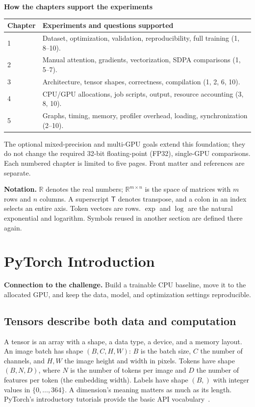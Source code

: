 \documentclass[11pt,a4paper,oneside]{report}
\newcommand{\R}{\mathbb{R}}
\newcommand{\purpose}[1]{\textbf{Connection to the challenge.} #1\par}
\newcounter{chapterstartpage}
\begin{document}
\textbf{How the chapters support the experiments}
\begin{center}
\begin{tabularx}{\textwidth}{@{}lY@{}}
\toprule
Chapter & Experiments and questions supported\\ & Dataset, optimization, validation, reproducibility, full training (1, 8--10).\\
2 & Manual attention, gradients, vectorization, SDPA comparisons (1, 5--7).\\
3 & Architecture, tensor shapes, correctness, compilation (1, 2, 6, 10).\\
4 & CPU/GPU allocations, job scripts, output, resource accounting (3, 8, 10).\\
5 & Graphs, timing, memory, profiler overhead, loading, synchronization (2--10).\\
\bottomrule
\end{tabularx}
\end{center}
The optional mixed-precision and multi-GPU goals extend this foundation; they
do not change the required 32-bit floating-point (FP32), single-GPU comparisons. Each numbered chapter
is limited to five pages. Front matter and references are separate.

\textbf{Notation.} $\R$ denotes the real numbers; $\R^{m\times n}$ is the
space of matrices with $m$ rows and $n$ columns. A superscript
$\mathsf T$ denotes transpose, and a colon in an index selects an entire
axis. Token vectors are rows. $\exp$ and $\log$ are the natural exponential
and logarithm. Symbols reused in another section are defined there again.
\clearpage
{}

\chapter{PyTorch Introduction}\label{ch:pytorch}
\setcounter{chapterstartpage}{\value{page}}
\purpose{Build a trainable CPU baseline, move it to the allocated GPU, and
keep the data, model, and optimization settings reproducible.}

\section{Tensors describe both data and computation}
A tensor is an array with a shape, a data type, a device, and a memory layout.
An image batch has shape $(B,C,H,W)$: $B$ is the batch size, $C$ the number
of channels, and $H,W$ the image height and width in pixels. Tokens have
shape $(B,N,D)$, where $N$ is the number of tokens per image and $D$ the
number of features per token (the embedding width). Labels have shape $(B,)$ with integer values in
$\{0,\ldots,364\}$. A dimension's meaning matters as much as its length.
PyTorch's introductory tutorials provide the basic API vocabulary~\cite{pytorchbasics}.
\end{document}
